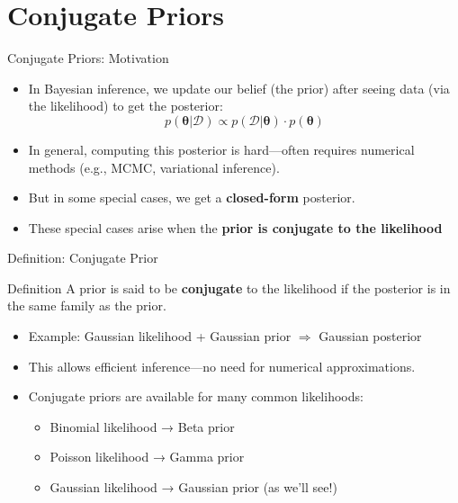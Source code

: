 \documentclass{beamer}
\begin{document}
\section{Conjugate Priors}


\begin{frame}{Conjugate Priors: Motivation}
  \begin{itemize}
    \item In Bayesian inference, we update our belief (the prior) after seeing data (via the likelihood) to get the posterior:
      \[
        p(\bm{\theta} | \mathcal{D}) \propto p(\mathcal{D} | \bm{\theta}) \cdot p(\bm{\theta})
      \]
    \item In general, computing this posterior is hard—often requires numerical methods (e.g., MCMC, variational inference).
    \item But in some special cases, we get a \textbf{closed-form} posterior.
    \item These special cases arise when the \textbf{prior is conjugate to the likelihood}
  \end{itemize}
\end{frame}

\begin{frame}{Definition: Conjugate Prior}
  \begin{block}{Definition}
    A prior is said to be \textbf{conjugate} to the likelihood if the posterior is in the same family as the prior.
  \end{block}
  \begin{itemize}
    \item Example: Gaussian likelihood + Gaussian prior $\Rightarrow$ Gaussian posterior
    \item This allows efficient inference—no need for numerical approximations.
    \item Conjugate priors are available for many common likelihoods:
      \begin{itemize}
        \item Binomial likelihood → Beta prior
        \item Poisson likelihood → Gamma prior
        \item Gaussian likelihood → Gaussian prior (as we'll see!)
      \end{itemize}
  \end{itemize}
\end{frame}
\end{document}
